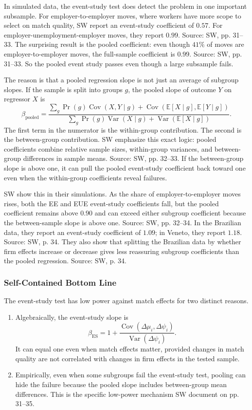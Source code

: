 ﻿\documentclass[11pt]{article}
\newcommand{\E}{\mathbb{E}}
\newcommand{\1}{\mathbf{1}}
\newcommand{\Var}{\operatorname{Var}}
\newcommand{\Cov}{\operatorname{Cov}}
\begin{document}
In simulated data, the event-study test does detect the problem in one important
subsample. For employer-to-employer moves, where workers have more scope to
select on match quality, SW report an event-study coefficient of $0.57$. For
employer-unemployment-employer moves, they report $0.99$. Source: SW, pp.
31--33. The surprising result is the pooled coefficient: even though $41\%$ of
moves are employer-to-employer moves, the full-sample coefficient is $0.99$.
Source: SW, pp. 31--33. So the pooled event study passes even though a large
subsample fails.

The reason is that a pooled regression slope is not just an average of subgroup
slopes. If the sample is split into groups $g$, the pooled slope of outcome $Y$
on regressor $X$ is
\[
\beta_{\mathrm{pooled}}
=
\frac{\sum_g \Pr(g)\Cov(X,Y\mid g)
+\Cov(\E[X\mid g],\E[Y\mid g])}
{\sum_g \Pr(g)\Var(X\mid g)+\Var(\E[X\mid g])}.
\tag{pooled}
\]
The first term in the numerator is the within-group contribution. The second is
the between-group contribution. SW emphasize this exact logic: pooled
coefficients combine relative sample sizes, within-group variances, and
between-group differences in sample means. Source: SW, pp. 32--33. If the
between-group slope is above one, it can pull the pooled event-study coefficient
back toward one even when the within-group coefficients reveal failures.

SW show this in their simulations. As the share of employer-to-employer moves
rises, both the EE and EUE event-study coefficients fall, but the pooled
coefficient remains above $0.90$ and can exceed either subgroup coefficient
because the between-sample slope is above one. Source: SW, pp. 32--34. In the
Brazilian data, they report an event-study coefficient of $1.09$; in Veneto, they
report $1.18$. Source: SW, p. 34. They also show that splitting the Brazilian
data by whether firm effects increase or decrease gives less reassuring subgroup
coefficients than the pooled regression. Source: SW, p. 34.

\subsubsection{Self-Contained Bottom Line}

The event-study test has low power against match effects for two distinct
reasons.

\begin{enumerate}
\item Algebraically, the event-study slope is
\[
\beta_{\mathrm{ES}}
=
1+\frac{\Cov(\Delta\mu_i,\Delta\psi_i)}{\Var(\Delta\psi_i)}.
\]
It can equal one even when match effects matter, provided changes in match
quality are not correlated with changes in firm effects in the tested sample.

\item Empirically, even when some subgroups fail the event-study test, pooling can
hide the failure because the pooled slope includes between-group mean
differences. This is the specific low-power mechanism SW document on pp. 31--35.
\end{enumerate}
\end{document}

